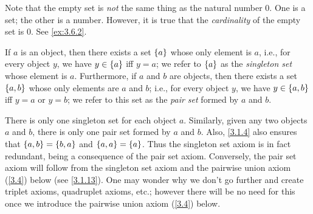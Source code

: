 \begin{rmk}\label{3.1.8}
  Note that the empty set is \emph{not} the same thing as the natural number \(0\).
  One is a set;
  the other is a number.
  However, it is true that the \emph{cardinality} of the empty set is \(0\).
  See \cref{ex:3.6.2}.
\end{rmk}

\begin{ax}\label{3.3}
  If \(a\) is an object, then there exists a set \(\left\lbrace a\right\rbrace\) whose only element is \(a\), i.e., for every object \(y\), we have \(y \in \left\lbrace a\right\rbrace\) iff \(y = a\);
  we refer to \(\left\lbrace a\right\rbrace\) as the \emph{singleton set} whose element is \(a\).
  Furthermore, if \(a\) and \(b\) are objects, then there exists a set \(\left\lbrace a, b\right\rbrace\) whose only elements are \(a\) and \(b\);
  i.e., for every object \(y\), we have \(y \in \left\lbrace a, b\right\rbrace\) iff \(y = a\) or \(y = b\);
  we refer to this set as the \emph{pair set} formed by \(a\) and \(b\).
\end{ax}

\begin{rmk}\label{3.1.9}
  There is only one singleton set for each object \(a\).
  Similarly, given any two objects \(a\) and \(b\), there is only one pair set formed by \(a\) and \(b\).
  Also, \cref{3.1.4} also ensures that \(\left\lbrace a, b\right\rbrace = \left\lbrace b, a\right\rbrace\) and \(\left\lbrace a, a\right\rbrace = \left\lbrace a\right\rbrace\).
  Thus the singleton set axiom is in fact redundant, being a consequence of the pair set axiom.
  Conversely, the pair set axiom will follow from the singleton set axiom and the pairwise union axiom (\cref{3.4}) below (see \cref{3.1.13}).
  One may wonder why we don't go further and create triplet axioms, quadruplet axioms, etc.;
  however there will be no need for this once we introduce the pairwise union axiom (\cref{3.4}) below.
\end{rmk}

